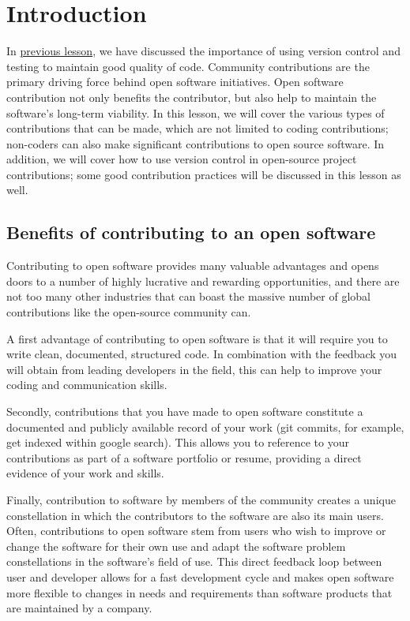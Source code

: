 \documentclass[
  letterpaper,
  DIV=11,
  numbers=noendperiod]{scrreport}
\begin{document}
\hypertarget{introduction-9}{%
\section{Introduction}\label{introduction-9}}

In
\href{https://hackmd.io/@TOPS-OC3-code/rk2U4xz5q/\%2FcZYalfBRSCyBTeVtsbfNng}{previous
lesson}, we have discussed the importance of using version control and
testing to maintain good quality of code. Community contributions are
the primary driving force behind open software initiatives. Open
software contribution not only benefits the contributor, but also help
to maintain the software's long-term viability. In this lesson, we will
cover the various types of contributions that can be made, which are not
limited to coding contributions; non-coders can also make significant
contributions to open source software. In addition, we will cover how to
use version control in open-source project contributions; some good
contribution practices will be discussed in this lesson as well.

\hypertarget{benefits-of-contributing-to-an-open-software}{%
\subsection{Benefits of contributing to an open
software}\label{benefits-of-contributing-to-an-open-software}}

Contributing to open software provides many valuable advantages and
opens doors to a number of highly lucrative and rewarding opportunities,
and there are not too many other industries that can boast the massive
number of global contributions like the open-source community can.

A first advantage of contributing to open software is that it will
require you to write clean, documented, structured code. In combination
with the feedback you will obtain from leading developers in the field,
this can help to improve your coding and communication skills.

Secondly, contributions that you have made to open software constitute a
documented and publicly available record of your work (git commits, for
example, get indexed within google search). This allows you to reference
to your contributions as part of a software portfolio or resume,
providing a direct evidence of your work and skills.

Finally, contribution to software by members of the community creates a
unique constellation in which the contributors to the software are also
its main users. Often, contributions to open software stem from users
who wish to improve or change the software for their own use and adapt
the software problem constellations in the software's field of use. This
direct feedback loop between user and developer allows for a fast
development cycle and makes open software more flexible to changes in
needs and requirements than software products that are maintained by a
company.
\end{document}
